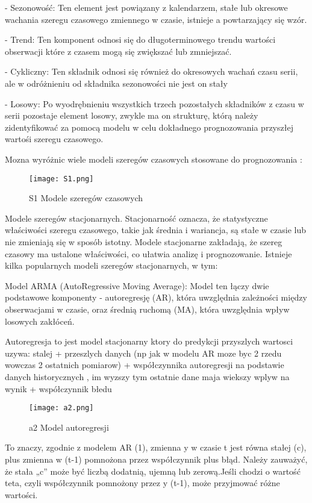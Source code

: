 - Sezonowość: Ten element jest powiązany z kalendarzem,  stałe lub okresowe wachania szeregu czasowego zmiennego w czasie,  istnieje a powtarzający się wzór.

- Trend: Ten komponent odnosi się do długoterminowego trendu wartości obserwacji które z czasem mogą się zwiększać lub zmniejszać.

- Cykliczny: Ten składnik odnosi się również do okresowych wachań czasu serii, ale w odróżnieniu od składnika sezonowości nie jest on stały 

- Losowy: Po wyodrębnieniu wszystkich trzech pozostałych składników z czasu w serii pozostaje element losowy, zwykle ma on strukturę, którą należy zidentyfikować za pomocą modelu w celu dokładnego prognozowania przyszłej wartośi szeregu czasowego.
\cite{Shekh2018}


Mozna wyróżnic wiele modeli szeregów czasowych stosowane do prognozowania :

\begin{figure}[h!]
    \label{fig:S1}
    \centering \texttt{[image: S1.png]}
    \caption{S1 Modele szeregów czasowych\cite{szer2009}}
\end{figure}

Modele szeregów stacjonarnych. Stacjonarność oznacza, że statystyczne właściwości szeregu czasowego, takie jak średnia i wariancja, są stałe w czasie lub nie zmieniają się w sposób istotny.  Modele stacjonarne zakładają, że szereg czasowy ma ustalone właściwości, co ułatwia analizę i prognozowanie. Istnieje kilka popularnych modeli szeregów stacjonarnych, w tym: 

Model ARMA (AutoRegressive Moving Average): Model ten łączy dwie podstawowe komponenty - autoregresję (AR), która uwzględnia zależności między obserwacjami w czasie, oraz średnią ruchomą (MA), która uwzględnia wpływ losowych zakłóceń. 

Autoregresja to jest model stacjonarny ktory do predykcji przyszlych wartosci uzywa: stalej + przeszlych danych (np jak w modelu AR moze byc 2 rzedu wowczas 2 ostatnich pomiarow) + współczynnika autoregresji  na podstawie danych historycznych , im wyzszy tym ostatnie dane maja wiekszy wplyw na wynik + współczynnik błedu \cite{auto2023}\cite{autor2023}

\begin{figure}[h!]
    \label{fig:a2}
    \centering \texttt{[image: a2.png]}
    \caption{a2 Model autoregresji\cite{mod2023}}
\end{figure}
To znaczy, zgodnie z modelem AR (1), zmienna y w czasie t jest równa stałej (c), plus zmienna w (t-1) pomnożona przez współczynnik plus błąd. Należy zauważyć, że stała „c” może być liczbą dodatnią, ujemną lub zerową.Jeśli chodzi o wartość teta, czyli współczynnik pomnożony przez y (t-1), może przyjmować różne wartości.


